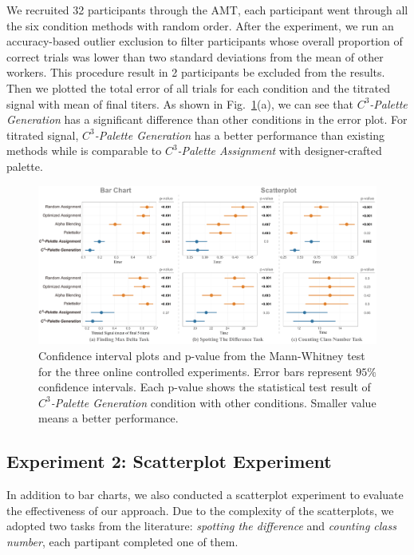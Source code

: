 {
We recruited 32 participants through the AMT, each participant went through all the six condition methods with random order. After the experiment, we run an accuracy-based outlier exclusion to filter participants whose overall proportion of correct trials was lower than two standard deviations from the mean of other workers. This procedure result in 2 participants be excluded from the results. Then we plotted the total error of all trials for each condition and the titrated signal with mean of final titers. As shown in Fig.~\ref{fig:userResults}(a), we can see that \emph{$C^3$-Palette Generation} has a significant difference than other conditions in the error plot. For titrated signal, \emph{$C^3$-Palette Generation} has a better performance than existing methods while is comparable to \emph{$C^3$-Palette Assignment} with designer-crafted palette.

\begin{figure}[t]
\centering
\includegraphics[width=1\linewidth]{figures/user-result-formal.pdf}
\caption{Confidence interval plots and p-value from the Mann-Whitney test for the three online controlled experiments. Error bars represent $95\%$ confidence intervals. Each p-value shows the statistical test result of \emph{$C^3$-Palette Generation} condition with other conditions. Smaller value means a better performance.}
\vspace*{-3mm}
\label{fig:userResults}
\end{figure}

\subsection{Experiment 2: Scatterplot Experiment}
\label{subsec:scatterplotExp}
In addition to bar charts, we also conducted a scatterplot experiment to evaluate the effectiveness of our approach. Due to the complexity of the scatterplots, we adopted two tasks from the literature: \emph{spotting the difference} and \emph{counting class number}, each partipant completed one of them.

}
